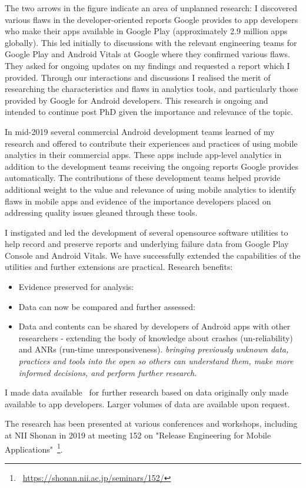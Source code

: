 The two arrows in the figure indicate an area of unplanned research: 
%
I discovered various flaws in the developer-oriented reports Google provides to app developers who make their apps available in Google Play (approximately 2.9 million apps globally). This led initially to discussions with the relevant engineering teams for Google Play and Android Vitals at Google where they confirmed various flaws. They asked for ongoing updates on my findings and requested a report which I provided. Through our interactions and discussions I realised the merit of researching the characteristics and flaws in analytics tools, and particularly those provided by Google for Android developers. This research is ongoing and intended to continue post PhD given the importance and relevance of the topic.

In mid-2019 several commercial Android development teams learned of my research and offered to contribute their experiences and practices of using mobile analytics in their commercial apps. These apps include app-level analytics in addition to the development teams receiving the ongoing reports Google provides automatically. The contributions of these development teams helped provide additional weight to the value and relevance of using mobile analytics to identify flaws in mobile apps and evidence of the importance developers placed on addressing quality issues gleaned through these tools.


I instigated and led the development of several opensource software utilities to help record and preserve reports and underlying failure data from Google Play Console and Android Vitals. We have successfully extended the capabilities of the utilities and further extensions are practical. Research benefits:
\begin{itemize}
    \item Evidence preserved for analysis:
    \item Data can now be compared and further assessed:
    \item Data and contents can be shared by developers of Android apps with other researchers - extending the body of knowledge about crashes (un-reliability) and ANRs (run-time unresponsiveness). \emph{bringing previously unknown data, practices and tools into the open so others can understand them, make more informed decisions, and perform further research.}
\end{itemize}

I made data available~\cite{harty_wama_dataset_examples} for further research based on data originally only made available to app developers. Larger volumes of data are available upon request.

The research has been presented at various conferences and workshops, including at NII Shonan in 2019 at meeting 152 on "Release Engineering for Mobile Applications"~\footnote{~\url{https://shonan.nii.ac.jp/seminars/152/}}. 
